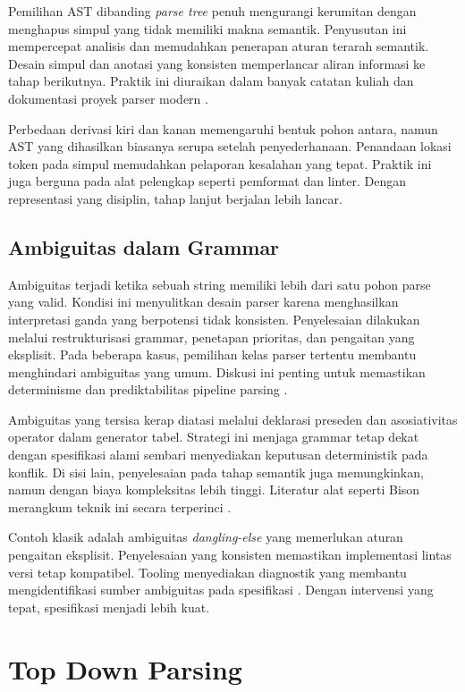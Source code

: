 \documentclass[../main.tex]{subfiles}
\begin{document}
Pemilihan AST dibanding \emph{parse tree} penuh mengurangi kerumitan dengan menghapus simpul yang tidak memiliki makna semantik. Penyusutan ini mempercepat analisis dan memudahkan penerapan aturan terarah semantik. Desain simpul dan anotasi yang konsisten memperlancar aliran informasi ke tahap berikutnya. Praktik ini diuraikan dalam banyak catatan kuliah dan dokumentasi proyek parser modern \citep{WikiAST,ANTLRDocs}.

Perbedaan derivasi kiri dan kanan memengaruhi bentuk pohon antara, namun AST yang dihasilkan biasanya serupa setelah penyederhanaan. Penandaan lokasi token pada simpul memudahkan pelaporan kesalahan yang tepat. Praktik ini juga berguna pada alat pelengkap seperti pemformat dan linter. Dengan representasi yang disiplin, tahap lanjut berjalan lebih lancar.

\subsection{Ambiguitas dalam Grammar}
Ambiguitas terjadi ketika sebuah string memiliki lebih dari satu pohon parse yang valid. Kondisi ini menyulitkan desain parser karena menghasilkan interpretasi ganda yang berpotensi tidak konsisten. Penyelesaian dilakukan melalui restrukturisasi grammar, penetapan prioritas, dan pengaitan yang eksplisit. Pada beberapa kasus, pemilihan kelas parser tertentu membantu menghindari ambiguitas yang umum. Diskusi ini penting untuk memastikan determinisme dan prediktabilitas pipeline parsing \citep{Mogensen2010}.

Ambiguitas yang tersisa kerap diatasi melalui deklarasi preseden dan asosiativitas operator dalam generator tabel. Strategi ini menjaga grammar tetap dekat dengan spesifikasi alami sembari menyediakan keputusan deterministik pada konflik. Di sisi lain, penyelesaian pada tahap semantik juga memungkinkan, namun dengan biaya kompleksitas lebih tinggi. Literatur alat seperti Bison merangkum teknik ini secara terperinci \citep{BisonManual}.

Contoh klasik adalah ambiguitas \emph{dangling-else} yang memerlukan aturan pengaitan eksplisit. Penyelesaian yang konsisten memastikan implementasi lintas versi tetap kompatibel. Tooling menyediakan diagnostik yang membantu mengidentifikasi sumber ambiguitas pada spesifikasi \citep{Mogensen2010}. Dengan intervensi yang tepat, spesifikasi menjadi lebih kuat.

\section{Top Down Parsing}
\end{document}
